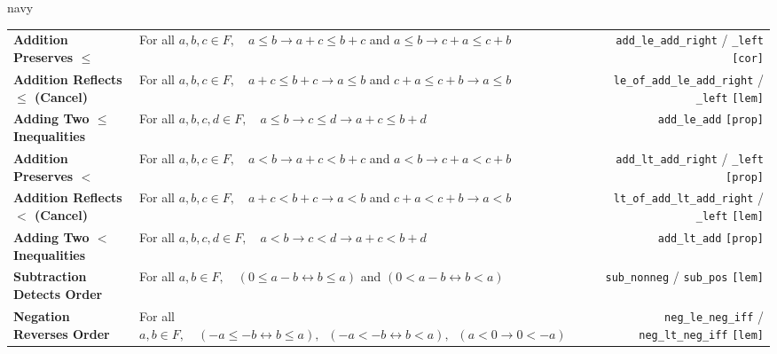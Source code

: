 \documentclass[10pt]{article}
\newcommand{\lean}[1]{\texttt{\scriptsize\color{navy}#1}}
\newcommand{\kind}[1]{\texttt{\scriptsize\color{muted}[#1]}}
\begin{document}
\begin{axbox}[title={Group 5: Order \& Addition (Translation Invariance, Cancellation \& Sign Flip)}]{navy}
\scriptsize
\begin{tabularx}{\linewidth}{@{}>{\raggedright\arraybackslash}p{4.2cm} >{\raggedright\arraybackslash}X r@{}}
\textbf{Addition Preserves $\le$} & For all $a, b, c \in F,\quad a \le b \to a + c \le b + c$ \quad and \quad $a \le b \to c + a \le c + b$ & \lean{add\_le\_add\_right} / \lean{\_left} \kind{cor} \\
\textbf{Addition Reflects $\le$ (Cancel)} & For all $a, b, c \in F,\quad a + c \le b + c \to a \le b$ \quad and \quad $c + a \le c + b \to a \le b$ & \lean{le\_of\_add\_le\_add\_right} / \lean{\_left} \kind{lem} \\
\textbf{Adding Two $\le$ Inequalities} & For all $a, b, c, d \in F,\quad a \le b \to c \le d \to a + c \le b + d$ & \lean{add\_le\_add} \kind{prop} \\
\textbf{Addition Preserves $<$} & For all $a, b, c \in F,\quad a < b \to a + c < b + c$ \quad and \quad $a < b \to c + a < c + b$ & \lean{add\_lt\_add\_right} / \lean{\_left} \kind{prop} \\
\textbf{Addition Reflects $<$ (Cancel)} & For all $a, b, c \in F,\quad a + c < b + c \to a < b$ \quad and \quad $c + a < c + b \to a < b$ & \lean{lt\_of\_add\_lt\_add\_right} / \lean{\_left} \kind{lem} \\
\textbf{Adding Two $<$ Inequalities} & For all $a, b, c, d \in F,\quad a < b \to c < d \to a + c < b + d$ & \lean{add\_lt\_add} \kind{prop} \\
\textbf{Subtraction Detects Order} & For all $a, b \in F,\quad (0 \le a - b \leftrightarrow b \le a)$ \quad and \quad $(0 < a - b \leftrightarrow b < a)$ & \lean{sub\_nonneg} / \lean{sub\_pos} \kind{lem} \\
\textbf{Negation Reverses Order} & For all $a, b \in F,\quad (-a \le -b \leftrightarrow b \le a),\;\; (-a < -b \leftrightarrow b < a),\;\; (a < 0 \to 0 < -a)$ & \lean{neg\_le\_neg\_iff} / \lean{neg\_lt\_neg\_iff} \kind{lem} \\
\end{tabularx}
\end{axbox}
\end{document}
